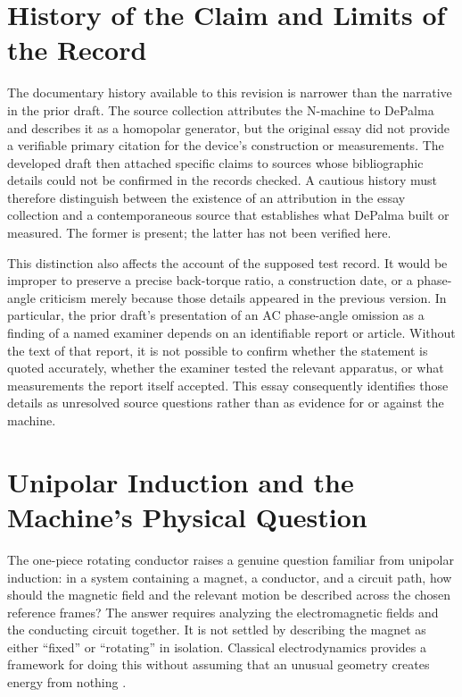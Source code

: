 \documentclass[11pt]{article}
\begin{document}
\section{History of the Claim and Limits of the Record}

The documentary history available to this revision is narrower than the narrative in the prior draft. The source collection attributes the N-machine to DePalma and describes it as a homopolar generator, but the original essay did not provide a verifiable primary citation for the device's construction or measurements. The developed draft then attached specific claims to sources whose bibliographic details could not be confirmed in the records checked. A cautious history must therefore distinguish between the existence of an attribution in the essay collection and a contemporaneous source that establishes what DePalma built or measured. The former is present; the latter has not been verified here.

This distinction also affects the account of the supposed test record. It would be improper to preserve a precise back-torque ratio, a construction date, or a phase-angle criticism merely because those details appeared in the previous version. In particular, the prior draft's presentation of an AC phase-angle omission as a finding of a named examiner depends on an identifiable report or article. Without the text of that report, it is not possible to confirm whether the statement is quoted accurately, whether the examiner tested the relevant apparatus, or what measurements the report itself accepted. This essay consequently identifies those details as unresolved source questions rather than as evidence for or against the machine.

\section{Unipolar Induction and the Machine's Physical Question}

The one-piece rotating conductor raises a genuine question familiar from unipolar induction: in a system containing a magnet, a conductor, and a circuit path, how should the magnetic field and the relevant motion be described across the chosen reference frames? The answer requires analyzing the electromagnetic fields and the conducting circuit together. It is not settled by describing the magnet as either ``fixed'' or ``rotating'' in isolation. Classical electrodynamics provides a framework for doing this without assuming that an unusual geometry creates energy from nothing \cite{Jackson1999}.
\end{document}
